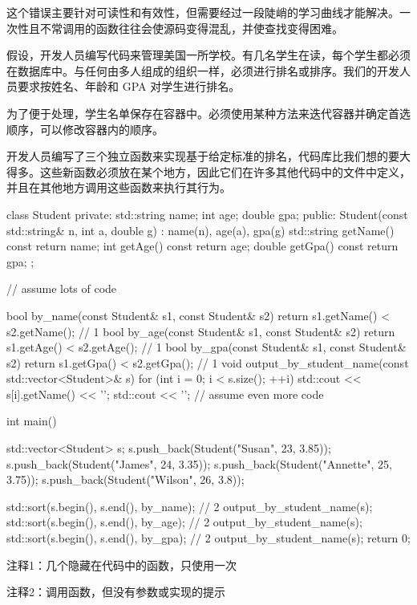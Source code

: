 这个错误主要针对可读性和有效性，但需要经过一段陡峭的学习曲线才能解决。一次性且不常调用的函数往往会使源码变得混乱，并使查找变得困难。


假设，开发人员编写代码来管理美国一所学校。有几名学生在读，每个学生都必须在数据库中。与任何由多人组成的组织一样，必须进行排名或排序。我们的开发人员要求按姓名、年龄和 GPA 对学生进行排名。

为了便于处理，学生名单保存在容器中。必须使用某种方法来迭代容器并确定首选顺序，可以修改容器内的顺序。

开发人员编写了三个独立函数来实现基于给定标准的排名，代码库比我们想的要大得多。这些新函数必须放在某个地方，因此它们在许多其他代码中的文件中定义，并且在其他地方调用这些函数来执行其行为。


\begin{cpp}
class Student {
private:
  std::string name;
  int age;
  double gpa;
public:
  Student(const std::string& n, int a, double g) : name(n), age(a), gpa(g) {}
  std::string getName() const { return name; }
  int getAge() const { return age; }
  double getGpa() const { return gpa; }
};

// assume lots of code

bool by_name(const Student& s1, const Student& s2)
{ return s1.getName() < s2.getName(); } // 1
bool by_age(const Student& s1, const Student& s2)
{ return s1.getAge() < s2.getAge(); } // 1
bool by_gpa(const Student& s1, const Student& s2)
{ return s1.getGpa() < s2.getGpa(); } // 1
void output_by_student_name(const std::vector<Student>& s) {
  for (int i = 0; i < s.size(); ++i)
    std::cout << s[i].getName() << '\n';
  std::cout << '\n';
}
// assume even more code

int main() {
  std::vector<Student> s;
  s.push_back(Student("Susan", 23, 3.85));
  s.push_back(Student("James", 24, 3.35));
  s.push_back(Student("Annette", 25, 3.75));
  s.push_back(Student("Wilson", 26, 3.8));

  std::sort(s.begin(), s.end(), by_name); // 2
  output_by_student_name(s);
  std::sort(s.begin(), s.end(), by_age); // 2
  output_by_student_name(s);
  std::sort(s.begin(), s.end(), by_gpa); // 2
  output_by_student_name(s);
  return 0;
}
\end{cpp}

{\footnotesize
注释1：几个隐藏在代码中的函数，只使用一次

注释2：调用函数，但没有参数或实现的提示
}

